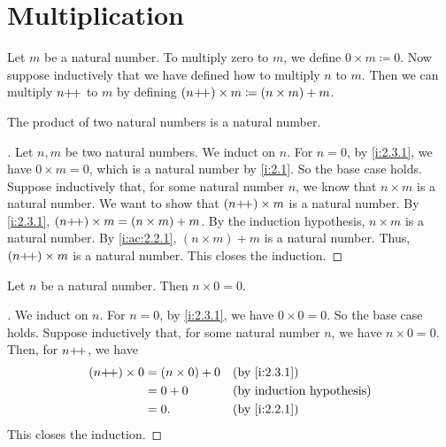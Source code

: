 \section{Multiplication}\label{i:sec:2.3}

\begin{defn}\label{i:2.3.1}
  Let \(m\) be a natural number.
  To multiply zero to \(m\), we define \(0 \times m \coloneqq 0\).
  Now suppose inductively that we have defined how to multiply \(n\) to \(m\).
  Then we can multiply \(n{+}\!{+}\) to \(m\) by defining \((n{+}\!{+}) \times m \coloneqq (n \times m) + m\).
\end{defn}

\begin{ac}\label{i:ac:2.3.1}
  The product of two natural numbers is a natural number.
\end{ac}

\begin{proof}[]
  Let \(n, m\) be two natural numbers.
  We induct on \(n\).
  For \(n = 0\), by \cref{i:2.3.1}, we have \(0 \times m = 0\), which is a natural number by \cref{i:2.1}.
  So the base case holds.
  Suppose inductively that, for some natural number \(n\), we know that \(n \times m\) is a natural number.
  We want to show that \((n{+}\!{+}) \times m\) is a natural number.
  By \cref{i:2.3.1}, \((n{+}\!{+}) \times m = (n \times m) + m\).
  By the induction hypothesis, \(n \times m\) is a natural number.
  By \cref{i:ac:2.2.1}, \((n \times m) + m\) is a natural number.
  Thus, \((n{+}\!{+}) \times m\) is a natural number.
  This closes the induction.
\end{proof}

\begin{ac}\label{i:ac:2.3.2}
  Let \(n\) be a natural number.
  Then \(n \times 0 = 0\).
\end{ac}

\begin{proof}[]
  We induct on \(n\).
  For \(n = 0\), by \cref{i:2.3.1}, we have \(0 \times 0 = 0\).
  So the base case holds.
  Suppose inductively that, for some natural number \(n\), we have \(n \times 0 = 0\).
  Then, for \(n{+}\!{+}\), we have
  \begin{align*}
    (n\pp) \times 0 & = (n \times 0) + 0 &  & \by{i:2.3.1} \\
                    & = 0 + 0            &  & \byIH        \\
                    & = 0.               &  & \by{i:2.2.1}
  \end{align*}
  This closes the induction.
\end{proof}

